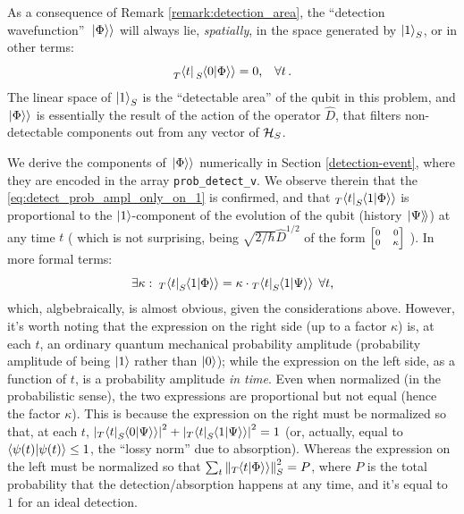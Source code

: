 As a consequence of Remark \ref{remark:detection_area},
the ``detection wavefunction''~$\left.\left| \Phi \right\rangle\right\rangle$ will always lie,
\emph{spatially},
in the space generated by $\ket{1}_S$, or in other terms:
\begin{equation}\label{eq:detect_prob_ampl_only_on_1}
  \prescript{}{T}{\bra{t}}\prescript{}{S}{\!\left.\left\langle 0 \middle| \Phi \right\rangle\right\rangle} = 0 \text{,} \quad \forall t \, \text{.}
\end{equation}
The linear space of $\ket{1}_S$ is the ``detectable area'' of the qubit
in this problem, and
$\left.\left| \Phi \right\rangle\right\rangle$ is essentially the result of the action of the operator $\hat{D}$,
that filters non-detectable components out from any vector of $\mathcal{H}_S$.

We derive the components of $\left.\left| \Phi \right\rangle\right\rangle$ numerically in Section \ref{detection-event},
where they are encoded in the array \texttt{prob_detect_v}.
We observe therein that the \eqref{eq:detect_prob_ampl_only_on_1} is confirmed,
and that ${}_T\!\bra{t} {}_S\!\!\left.\left\langle 1 \middle| \Phi \right\rangle\right\rangle$ is proportional
to the $\ket{1}$-component of the evolution of the qubit (history $\left.\left| \Psi \right\rangle\!\right\rangle$)
at any time $t$
(%
  which is not surprising, being $\sqrt{2/\hbar}\hat{D}^{1/2}$ of the form
  $\scriptsize \left[\begin{matrix}0 & 0\\0 & \kappa \end{matrix}\right]$%
).
In more formal terms:
\begin{equation}\label{eq:detect_prob_amplitude_proportional}
  \exists \kappa: \: {}_T\!\bra{t} {}_S\!\!\left.\left\langle 1 \middle| \Phi \right\rangle\right\rangle = \kappa \cdot {}_T\!\bra{t} {}_S\!\!\left.\left\langle 1 \middle| \Psi \right\rangle\right\rangle \; \forall t \text{,}
\end{equation}
which, algbebraically, is almost obvious, given the considerations above.
However, it's worth noting that the expression on the right side
(up to a factor $\kappa$) is, at each $t$,
an ordinary quantum mechanical probability amplitude
(probability amplitude of being $\ket{1}$ rather than $\ket{0}$);
while the expression on the left side, as a function of $t$,
is a probability amplitude \emph{in time}.
Even when normalized (in the probabilistic sense), the two expressions
are proportional but not equal (hence the factor $\kappa$).
This is because the expression on the right must be normalized
so that, at each $t$,
${ \abs{ {}_T\!\bra{t} {}_S\!\!\left.\left\langle 0 \middle| \Psi \right\rangle\right\rangle }^2 + \abs{ {}_T\!\bra{t} {}_S\!\!\left.\left\langle 1 \middle| \Psi \right\rangle\right\rangle }^2 = 1 }$
(or, actually, equal to $ \braket{\psi(t)} \leq 1$, the ``lossy norm'' due to absorption).
Whereas the expression on the left must be normalized so that
$\sum_t \norm{ {}_T\!\!\left.\left\langle t \middle| \Phi \right\rangle\right\rangle }_S^2 = P$,
where $P$ is the total probability that the detection/absorption happens at any time,
and it's equal to $1$ for an ideal detection.


